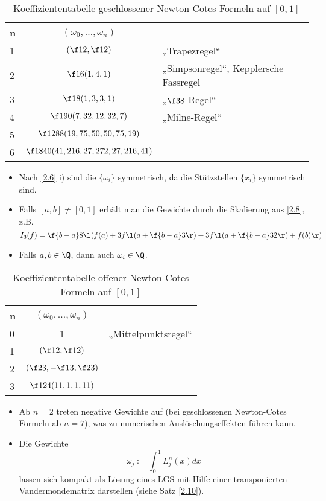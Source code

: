 \documentclass[11pt]{scrbook}
\begin{document}
\begin{table}[H]
	\centering
	\caption{Koeffiziententabelle geschlossener Newton-Cotes Formeln auf $[0,1]$}
	\begin{tabular}{l|cl}
		n & $(\omega_0, \dotsc, \omega_n)$ \\ \hline
		1 & $(\f 12, \f 12)$ & „Trapezregel“ \\ 
		2 & $\f 16 (1,4,1)$ & „Simpsonregel“, Kepplersche Fassregel \\
		3 & $\f 18 (1,3,3,1)$ & „$\f 38$-Regel“ \\
		4 & $\f 1{90} (7,32,12,32,7)$ & „Milne-Regel“ \\
		5 & $\f 1{288} (19,75,50,50,75,19)$ & \\
		6 & $\f 1{840} (41,216,27,272,27,216,41)$ &
	\end{tabular}
\end{table}

\begin{nt*}
	\begin{itemize}
		\item
			Nach \ref{2.6} i) sind die $\{\omega_i\}$ symmetrisch, da die Stützstellen $\{x_i\}$ symmetrisch sind.
		\item
			Falls $[a,b] \neq [0,1]$ erhält man die Gewichte durch die Skalierung aus \ref{2.8}, z.B.
			\[
				I_3(f) = \f {b-a}8 \l( f(a) + 3 f\l(a+\f {b-a}3\r) + 3 f\l(a+\f {b-a}3 2\r) + f(b) \r)
			\]
		\item
			Falls $a,b\in \Q$, dann auch $\omega_i \in \Q$.
	\end{itemize}
\end{nt*}

\begin{table}[H]
	\centering
	\caption{Koeffiziententabelle offener Newton-Cotes Formeln auf $[0,1]$}
	\begin{tabular}{l|cl}
		n & $(\omega_0, \dotsc, \omega_n)$ \\ \hline
		0 & 1 & „Mittelpunktsregel“ \\ 
		1 & $(\f 12, \f 12)$ & \\
		2 & $(\f 23, -\f 13, \f 23)$ &  \\
		3 & $\f 1{24} (11,1,1,11)$ &
	\end{tabular}
\end{table}

\begin{nt*}
	\begin{itemize}
		\item
			Ab $n=2$ treten negative Gewichte auf (bei geschlossenen Newton-Cotes Formeln ab $n=7$), was zu numerischen Auslöschungseffekten führen kann.
		\item
			Die Gewichte
			\[
				\omega_j := \int_0^1 L_j^n(x) dx
			\]
			lassen sich kompakt als Lösung eines LGS mit Hilfe einer transponierten Vandermondematrix darstellen (siehe Satz \ref{2.10}).
	\end{itemize}
\end{nt*}
\end{document}
